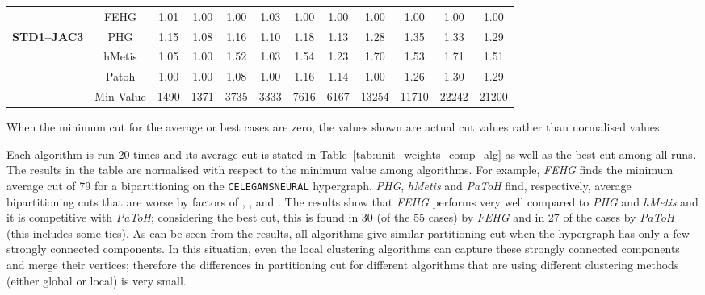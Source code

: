 \documentclass[twocolumn]{svjour3}          \smartqed
\begin{document}
\begin{table*}[hp]
{\begin{threeparttable}
\begin{tabular}{|l|c|cc|cc|cc|cc|cc|}
& FEHG			& 1.01	& 1.00	& 1.00	& 1.03	& 1.00	& 1.00	& 1.00	& 1.00	& 1.00	& 1.00 \\
\textbf{ STD1--JAC3}
			& PHG			& 1.15	& 1.08	& 1.16	& 1.10	& 1.18	& 1.13	& 1.28	& 1.35	& 1.33	& 1.29 \\
			& hMetis			& 1.05	& 1.00	& 1.52	& 1.03	& 1.54	& 1.23	& 1.70	& 1.53	& 1.71	& 1.51 \\
			& Patoh			& 1.00	& 1.00	& 1.08	& 1.00	& 1.16	& 1.14	& 1.00	& 1.26	& 1.30	& 1.29 \\
			\cline{2-12}
			& Min Value		& 1490	& 1371	& 3735	& 3333	& 7616	& 6167	& 13254	& 11710	& 22242 & 21200\\

			\hline
		\end{tabular}
		\begin{tablenotes}
			\item[\textasteriskcentered] When the minimum cut for the average or best cases are zero, the values
			 shown are actual cut values rather than normalised values. 
		\end{tablenotes}
	\end{threeparttable}
	}	\end{table*}




Each algorithm is run 20 times and its average cut is stated in Table~\ref{tab:unit_weights_comp_alg} as well as the best cut among all runs. The results in the table are normalised with respect to the minimum value among algorithms. For example, \textit{FEHG} finds the minimum average cut of 79 for a bipartitioning on the \texttt{CELEGANSNEURAL} hypergraph. \textit{PHG}, \textit{hMetis} and \textit{PaToH}  find, respectively, average bipartitioning cuts that are worse by factors of , , and .  The results show that \textit{FEHG} performs very well compared to \textit{PHG} and \textit{hMetis} and it is competitive with \textit{PaToH}; considering the best cut, this is found in 30 (of the 55 cases) by \textit{FEHG} and in 27 of the cases by \textit{PaToH} (this includes some ties). As can be seen from the results, all algorithms give similar partitioning cut when the hypergraph has only a few strongly connected components. In this situation, even the local clustering algorithms can capture these strongly connected components and merge their vertices; therefore the differences in partitioning cut for different algorithms that are using different clustering methods (either global or local) is very small.
\end{document}
